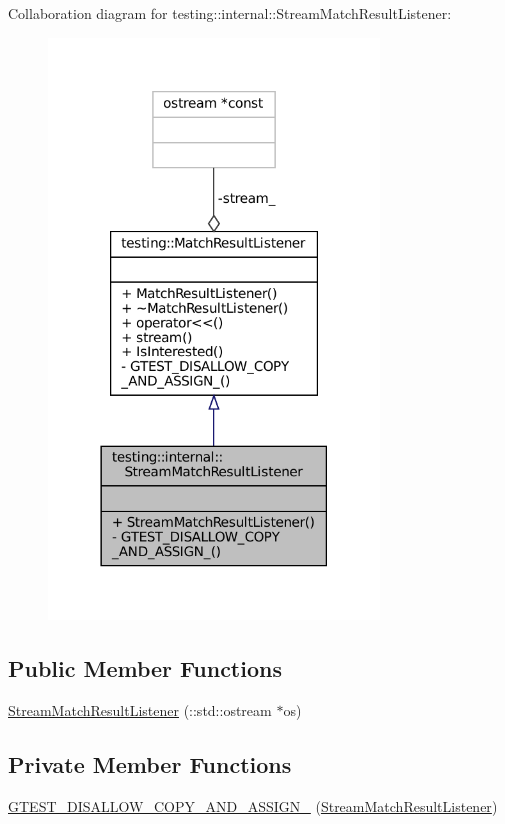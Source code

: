 Collaboration diagram for testing\+:\+:internal\+:\+:Stream\+Match\+Result\+Listener\+:
\nopagebreak
\begin{figure}[H]
\begin{center}
\leavevmode
\includegraphics[width=249pt]{classtesting_1_1internal_1_1StreamMatchResultListener__coll__graph}
\end{center}
\end{figure}
\subsection*{Public Member Functions}
\begin{DoxyCompactItemize}
\item 
\hyperlink{classtesting_1_1internal_1_1StreamMatchResultListener_a81985760741d818745237df002d65d04}{Stream\+Match\+Result\+Listener} (\+::std\+::ostream $\ast$os)
\end{DoxyCompactItemize}
\subsection*{Private Member Functions}
\begin{DoxyCompactItemize}
\item 
\hyperlink{classtesting_1_1internal_1_1StreamMatchResultListener_ad24adbcd6528e6d84f4f955500de58a9}{G\+T\+E\+S\+T\+\_\+\+D\+I\+S\+A\+L\+L\+O\+W\+\_\+\+C\+O\+P\+Y\+\_\+\+A\+N\+D\+\_\+\+A\+S\+S\+I\+G\+N\+\_\+} (\hyperlink{classtesting_1_1internal_1_1StreamMatchResultListener}{Stream\+Match\+Result\+Listener})
\end{DoxyCompactItemize}


